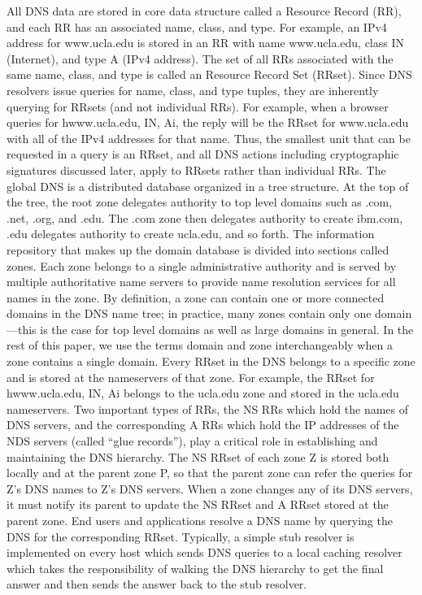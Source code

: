 All DNS data are stored in core data structure called a
Resource Record (RR), and each RR has an associated
name, class, and type. For example, an IPv4 address for
www.ucla.edu is stored in an RR with name www.ucla.edu,
class IN (Internet), and type A (IPv4 address). The set of all
RRs associated with the same name, class, and type is called
an Resource Record Set (RRset). Since DNS resolvers issue
queries for name, class, and type tuples, they are inherently
querying for RRsets (and not individual RRs). For example,
when a browser queries for hwww.ucla.edu, IN, Ai, the
reply will be the RRset for www.ucla.edu with all of the
IPv4 addresses for that name. Thus, the smallest unit that
can be requested in a query is an RRset, and all DNS actions
including cryptographic signatures discussed later, apply to
RRsets rather than individual RRs.
The global DNS is a distributed database organized in a
tree structure. At the top of the tree, the root zone delegates
authority to top level domains such as .com, .net, .org, and
.edu. The .com zone then delegates authority to create
ibm.com, .edu delegates authority to create ucla.edu,
and so forth. The information repository that makes up the
domain database is divided into sections called zones. Each
zone belongs to a single administrative authority and is
served by multiple authoritative name servers to provide
name resolution services for all names in the zone. By
definition, a zone can contain one or more connected
domains in the DNS name tree; in practice, many zones
contain only one domain—this is the case for top level
domains as well as large domains in general. In the rest of
this paper, we use the terms domain and zone interchangeably
when a zone contains a single domain.
Every RRset in the DNS belongs to a specific zone and is
stored at the nameservers of that zone. For example, the
RRset for hwww.ucla.edu, IN, Ai belongs to the
ucla.edu zone and stored in the ucla.edu nameservers.
Two important types of RRs, the NS RRs which hold the
names of DNS servers, and the corresponding A RRs which
hold the IP addresses of the NDS servers (called “glue
records”), play a critical role in establishing and maintaining
the DNS hierarchy. The NS RRset of each zone Z is
stored both locally and at the parent zone P, so that the
parent zone can refer the queries for Z’s DNS names to Z’s
DNS servers. When a zone changes any of its DNS servers,
it must notify its parent to update the NS RRset and A
RRset stored at the parent zone.
End users and applications resolve a DNS name by
querying the DNS for the corresponding RRset. Typically, a
simple stub resolver is implemented on every host which
sends DNS queries to a local caching resolver which takes the
responsibility of walking the DNS hierarchy to get the final
answer and then sends the answer back to the stub resolver.

